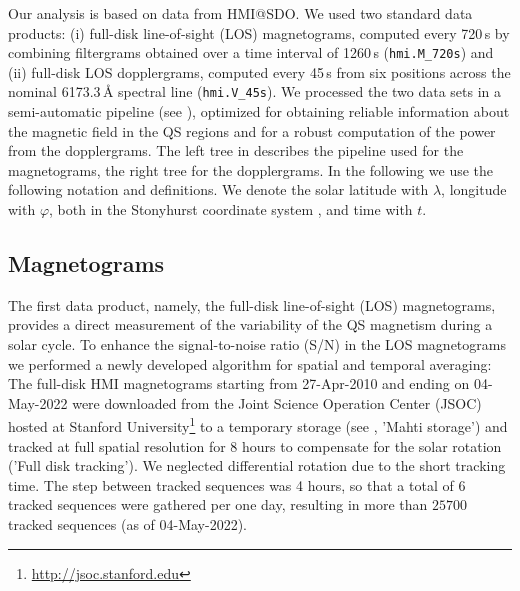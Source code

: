 \documentclass{aa}
\begin{document}
Our analysis is based on data from HMI@SDO. We used two standard data products: (i) full-disk line-of-sight (LOS) magnetograms, computed every 720\,s by combining filtergrams obtained over a time interval of 1260\,s (\texttt{hmi.M\_720s}) and (ii) full-disk LOS dopplergrams, computed every 45\,s from six positions across the nominal 6173.3\,\AA{} spectral line (\texttt{hmi.V\_45s}). We processed the two data sets in a semi-automatic pipeline (see ), optimized for obtaining reliable information about the magnetic field in the QS regions and for a robust computation of the \fff power from the dopplergrams. The left tree in  describes the pipeline used for the magnetograms, the right tree for the dopplergrams.
In the following we use the following notation and definitions. 
We denote the solar 
latitude with $\lambda$, longitude with $\varphi$, 
both in the Stonyhurst coordinate system \cite[]{Thomson06}, 
and time with $t$. 



\subsection{Magnetograms}

The first data product, namely, the full-disk line-of-sight (LOS) magnetograms, provides a direct measurement of the variability of the QS
magnetism during a solar cycle. To enhance the signal-to-noise ratio (S/N) in the LOS magnetograms we performed a newly developed algorithm for spatial and temporal averaging: The full-disk HMI magnetograms starting from 27-Apr-2010 and ending on 
04-May-2022
were downloaded from the Joint Science Operation Center (JSOC) hosted at Stanford University\footnote{\url{http://jsoc.stanford.edu}}
to a temporary storage (see , 'Mahti storage') and tracked at full spatial resolution for 8 hours to compensate for the solar rotation ('Full disk tracking').
We neglected differential rotation due to
the short tracking time.
The step between tracked sequences was 4 hours, so that a total of 6 tracked sequences were gathered per one day, resulting in more than 
$25700$ tracked sequences (as of 04-May-2022).
\end{document}

